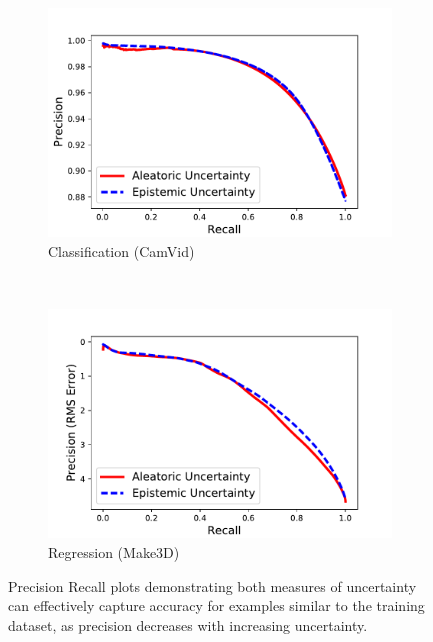 \begin{figure}[t]
    \centering
    \begin{subfigure}[t]{0.45\linewidth}
        \centering
        \includegraphics[width=\linewidth]{class_precision_recall}
        \caption{Classification (CamVid)}
    \end{subfigure}
    ~ 
    \begin{subfigure}[t]{0.45\linewidth}
        \centering
        \includegraphics[width=\linewidth]{regression_precision_recall}
        \caption{Regression (Make3D)}
    \end{subfigure}
    \caption[Precision Recall plots.]{Precision Recall plots demonstrating both measures of uncertainty can effectively capture accuracy for examples similar to the training dataset, as precision decreases with increasing uncertainty.}
\label{fig:prec_recall}
\end{figure}

